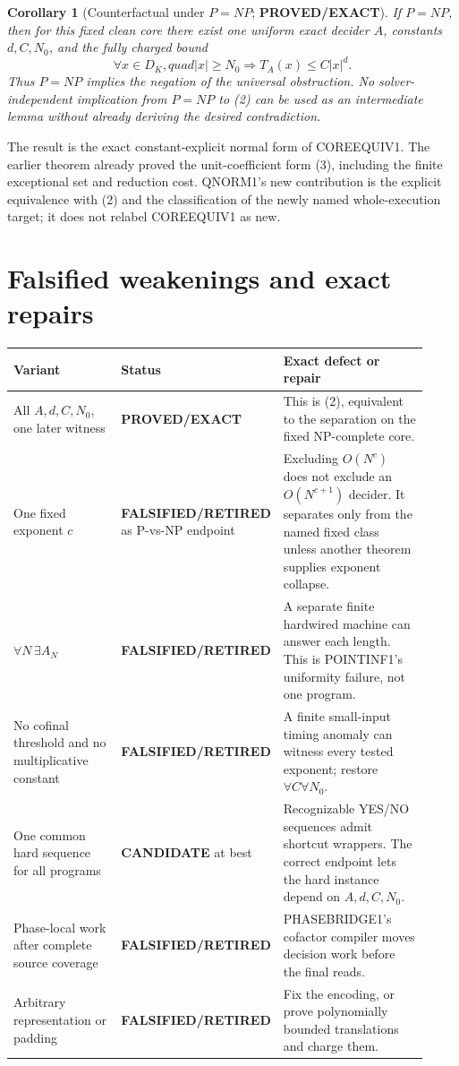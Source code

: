 \documentclass[11pt]{article}
\newtheorem{corollary}{Corollary}
\newcommand{\EXACT}{\textbf{PROVED/EXACT}}
\newcommand{\CAND}{\textbf{CANDIDATE}}
\newcommand{\RET}{\textbf{FALSIFIED/RETIRED}}
\begin{document}
\begin{corollary}[Counterfactual under \(P=NP\); \EXACT]
If \(P=NP\), then for this fixed clean core there exist one uniform exact
decider \(A\), constants \(d,C,N_0\), and the fully charged bound
\[
 \forall x\in D_K,quad |x|\ge N_0\Longrightarrow
 T_A(x)\le C|x|^d.                                         \tag{7}
\]
Thus \(P=NP\) implies the \emph{negation} of the universal obstruction.  No
solver-independent implication from \(P=NP\) to (2) can be used as an
intermediate lemma without already deriving the desired contradiction.
\end{corollary}

The result is the exact constant-explicit normal form of COREEQUIV1.  The
earlier theorem already proved the unit-coefficient form (3), including the
finite exceptional set and reduction cost.  QNORM1's new contribution is the
explicit equivalence with (2) and the classification of the newly named
whole-execution target; it does not relabel COREEQUIV1 as new.

\section{Falsified weakenings and exact repairs}

\begin{longtable}{p{0.31\linewidth}p{0.19\linewidth}p{0.42\linewidth}}
\toprule Variant & Status & Exact defect or repair\\ \midrule
All \(A,d,C,N_0\), one later witness & \EXACT & This is (2), equivalent to
the separation on the fixed NP-complete core.\\
One fixed exponent \(c\) & \RET{} as P-vs-NP endpoint & Excluding
\(O(N^c)\) does not exclude an \(O(N^{c+1})\) decider.  It separates only
from the named fixed class unless another theorem supplies exponent collapse.\\
\(\forall N\,\exists A_N\) & \RET & A separate finite hardwired machine can
answer each length.  This is POINTINF1's uniformity failure, not one program.\\
No cofinal threshold and no multiplicative constant & \RET & A finite
small-input timing anomaly can witness every tested exponent; restore
\(\forall C\forall N_0\).\\
One common hard sequence for all programs & \CAND{} at best & Recognizable
YES/NO sequences admit shortcut wrappers.  The correct endpoint lets the
hard instance depend on \(A,d,C,N_0\).\\
Phase-local work after complete source coverage & \RET & PHASEBRIDGE1's
cofactor compiler moves decision work before the final reads.\\
Arbitrary representation or padding & \RET & Fix the encoding, or prove
polynomially bounded translations and charge them.\\
\bottomrule
\end{longtable}
\end{document}
